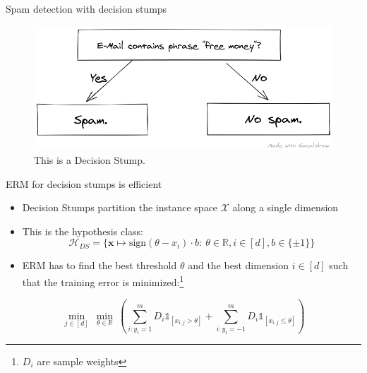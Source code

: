\begin{frame}{Spam detection with decision stumps}
    \begin{figure}
        \centering
        \includegraphics[width=\textwidth]{img/spam_classifier.png}
        \caption{This is a Decision Stump.}
    \end{figure}
\end{frame}

\begin{frame}{ERM for decision stumps is efficient}
    \begin{itemize}
        \item Decision Stumps partition the instance space $\mathcal{X}$
            along a single dimension \pause
        \item This is the hypothesis class: \pause
    \begin{equation*}
        \mathcal{H}_{DS} = \{ \mathbf{x} \mapsto \text{sign}\left( \theta - x_i \right) \cdot b: \ 
        \theta \in \mathbb{R}, i \in \left[ d \right], b \in \{ \pm 1 \} \}
    \end{equation*} \pause
        \item ERM has to find the best threshold $\theta$ and the best
            dimension $i \in [d]$ such that
            the training error is minimized:\footnote{$D_i$ are sample weights} \pause
    \end{itemize}
    \begin{equation*}
        \min_{j \in \left[ d \right]} \  \min_{\theta \in \mathbb{R}} \ 
        \left( \sum_{i: y_i=1}^m D_i \mathds{1}_{\left[ x_{i, j} > \theta \right]} + 
            \sum_{i: y_i=-1}^m D_i \mathds{1}_{\left[ x_{i, j} \leq \theta \right]} \right)
    \end{equation*} \pause
    \centering
\end{frame}

